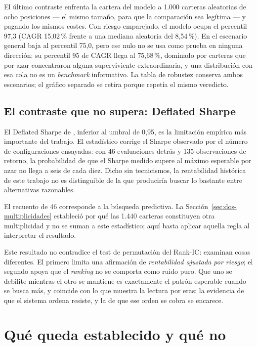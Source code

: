 El último contraste enfrenta la cartera del modelo a 1.000 carteras aleatorias de ocho posiciones
--- el mismo tamaño, para que la comparación sea legítima --- y pagando los mismos costes. Con
riesgo emparejado, el modelo ocupa el percentil 97,3 (CAGR 15,02\,\% frente a una mediana aleatoria
del 8,54\,\%). En el escenario general baja al percentil 75,0, pero ese nulo no se usa como prueba
en ninguna dirección: su percentil 95 de CAGR llega al 75,68\,\%, dominado por carteras que por azar
concentraron alguna superviviente extraordinaria, y una distribución con esa cola no es un
\textit{benchmark} informativo. La tabla de robustez conserva ambos escenarios; el gráfico separado
se retira porque repetía el mismo veredicto.

\subsection*{El contraste que no supera: Deflated Sharpe}

El Deflated Sharpe de \ProbabilidadDSR{}, inferior al umbral de 0,95, es la limitación empírica más importante del
trabajo. El estadístico corrige el Sharpe observado por el número de configuraciones ensayadas: con
46 evaluaciones detrás y 135 observaciones de retorno, la probabilidad de que el Sharpe medido supere
al máximo esperable por azar no llega a seis de cada diez. Dicho sin tecnicismos, la rentabilidad
histórica de este trabajo no es distinguible de la que produciría buscar lo bastante entre
alternativas razonables.

El recuento de 46 corresponde a la búsqueda predictiva. La Sección~\ref{sec:dos-multiplicidades}
estableció por qué las 1.440 carteras constituyen otra multiplicidad y no se suman a este
estadístico; aquí basta aplicar aquella regla al interpretar el resultado.

Este resultado no contradice el test de permutación del Rank-IC: examinan cosas diferentes. El
primero limita una afirmación de \emph{rentabilidad ajustada por riesgo}; el segundo apoya que el
\emph{ranking} no se comporta como ruido puro. Que uno se debilite mientras el otro se mantiene es
exactamente el patrón esperable cuando se busca más, y coincide con lo que muestra la lectura por
eras: la evidencia de que el sistema ordena resiste, y la de que ese orden se cobra se encarece.

\section*{Qué queda establecido y qué no}

